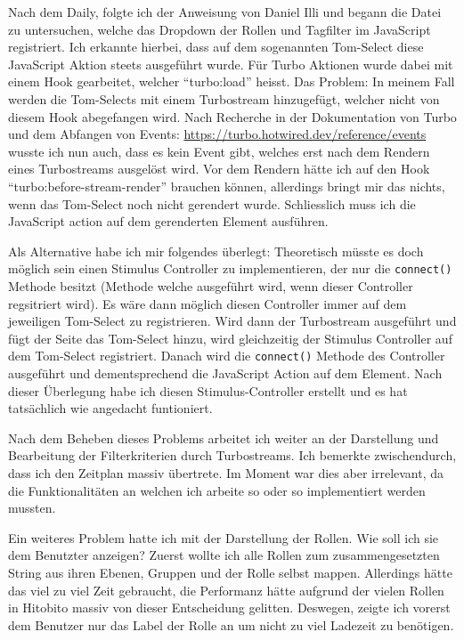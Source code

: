 Nach dem Daily, folgte ich der Anweisung von Daniel Illi und begann die Datei zu untersuchen, welche das Dropdown der Rollen und Tagfilter im JavaScript registriert.
Ich erkannte hierbei, dass auf dem sogenannten Tom-Select diese JavaScript Aktion steets ausgeführt wurde. Für Turbo Aktionen wurde dabei mit einem Hook gearbeitet, welcher
``turbo:load'' heisst. Das Problem: In meinem Fall werden die Tom-Selects mit einem Turbostream hinzugefügt, welcher nicht von diesem Hook abegefangen wird.
Nach Recherche in der Dokumentation von Turbo und dem Abfangen von Events: \href{Dokumentation}{https://turbo.hotwired.dev/reference/events} wusste ich nun auch, dass
es kein Event gibt, welches erst nach dem Rendern eines Turbostreams ausgelöst wird. Vor dem Rendern hätte ich auf den Hook ``turbo:before-stream-render'' brauchen können,
allerdings bringt mir das nichts, wenn das Tom-Select noch nicht gerendert wurde. Schliesslich muss ich die JavaScript action auf dem gerenderten Element ausführen.

Als Alternative habe ich mir folgendes überlegt: Theoretisch müsste es doch möglich sein einen Stimulus Controller zu implementieren, der nur die \texttt{connect()} Methode
besitzt (Methode welche ausgeführt wird, wenn dieser Controller regsitriert wird). Es wäre dann möglich diesen Controller immer auf dem jeweiligen Tom-Select zu registrieren.
Wird dann der Turbostream ausgeführt und fügt der Seite das Tom-Select hinzu, wird gleichzeitig der Stimulus Controller auf dem Tom-Select registriert. Danach wird die \texttt{connect()}
Methode des Controller ausgeführt und dementsprechend die JavaScript Action auf dem Element. Nach dieser Überlegung habe ich diesen Stimulus-Controller 
erstellt und es hat tatsächlich wie angedacht funtioniert.

Nach dem Beheben dieses Problems arbeitet ich weiter an der Darstellung und Bearbeitung der Filterkriterien durch Turbostreams.
Ich bemerkte zwischendurch, dass ich den Zeitplan massiv übertrete. Im Moment war dies aber irrelevant, da die Funktionalitäten an welchen ich 
arbeite so oder so implementiert werden mussten.

Ein weiteres Problem hatte ich mit der Darstellung der Rollen. Wie soll ich sie dem Benutzter anzeigen? Zuerst wollte ich alle Rollen zum zusammengesetzten
String aus ihren Ebenen, Gruppen und der Rolle selbst mappen. Allerdings hätte das viel zu viel Zeit gebraucht, die Performanz hätte aufgrund der vielen Rollen in
Hitobito massiv von dieser Entscheidung gelitten. Deswegen, zeigte ich vorerst dem Benutzer nur das Label der Rolle an um nicht zu viel Ladezeit zu benötigen.

